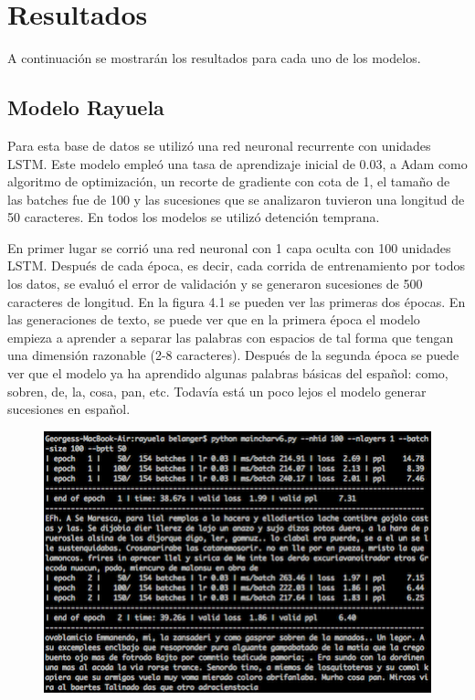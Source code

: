 \section{Resultados}
A continuación se mostrarán los resultados para cada uno de los modelos.

\subsection{Modelo Rayuela}
Para esta base de datos se utilizó una red neuronal recurrente con unidades LSTM. Este modelo empleó una tasa de aprendizaje inicial de 0.03, a Adam como algoritmo de optimización, un recorte de gradiente con cota de 1, el tamaño de las batches fue de 100 y las sucesiones que se analizaron tuvieron una longitud de 50 caracteres. En todos los modelos se utilizó detención temprana.

\vspace{1em}

En primer lugar se corrió una red neuronal con 1 capa oculta con 100 unidades LSTM. Después de cada época, es decir, cada corrida de entrenamiento por todos los datos, se evaluó el error de validación y se generaron sucesiones de 500 caracteres de longitud. En la figura 4.1 se pueden ver las primeras dos épocas. En las generaciones de texto, se puede ver que en la primera época el modelo empieza a aprender a separar las palabras con espacios de tal forma que tengan una dimensión razonable (2-8 caracteres). Después de la segunda época se puede ver que el modelo ya ha aprendido algunas palabras básicas del español: como, sobren, de, la, cosa, pan, etc. Todavía está un poco lejos el modelo generar sucesiones en español. 

\begin{figure}[h]
\begin{center}
\includegraphics{./imag/ray11.png}
\end{center}
\caption{}
\end{figure}


